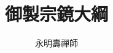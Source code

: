 \documentclass[11pt]{book}
\newcommand{\kai}{\kaishu}
\begin{document}
\title{御製宗鏡大綱}
\author{永明壽禪師}
\date{}
\maketitle
\newpage

\tableofcontents
\newpage







\printindex
\end{document}
